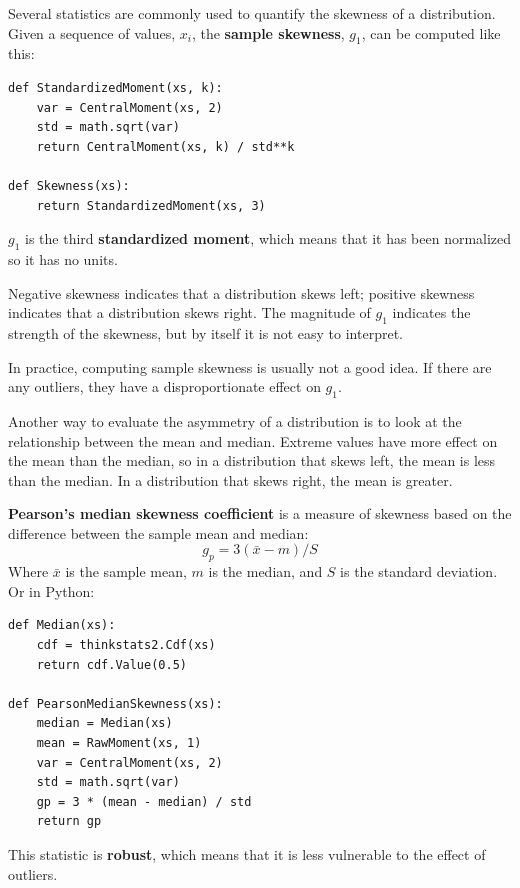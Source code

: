 \documentclass[12pt]{book}
\newcommand{\xbar}{\bar{x}}
\theoremstyle{exercise}
\begin{document}
Several statistics are commonly used to quantify the skewness of a
distribution.  Given a sequence of values, $x_i$, the {\bf sample
  skewness}, $g_1$, can be computed like this:

\begin{verbatim}
def StandardizedMoment(xs, k):
    var = CentralMoment(xs, 2)
    std = math.sqrt(var)
    return CentralMoment(xs, k) / std**k

def Skewness(xs):
    return StandardizedMoment(xs, 3)
\end{verbatim}

$g_1$ is the third {\bf standardized moment}, which means that it has
been normalized so it has no units.%

Negative skewness indicates that a distribution 
skews left; positive skewness indicates
that a distribution skews right.  The magnitude of $g_1$ indicates
the strength of the skewness, but by itself it is not easy to
interpret.

In practice, computing sample skewness is usually not
a good idea.  If there are any outliers, they
have a disproportionate effect on $g_1$.%

Another way to evaluate the asymmetry of a distribution is to look
at the relationship between the mean and median.
Extreme values have more effect on the mean than the median, so
in a distribution that skews left, the mean is less than the median.
In a distribution that skews right, the mean is greater.%
%

{\bf Pearson's median skewness coefficient} is a measure
of skewness based on the difference between the
sample mean and median:
%
\[ g_p = 3 (\xbar - m) / S \]
%
Where $\xbar$ is the sample mean, $m$ is the median, and
$S$ is the standard deviation.  Or in Python:%

\begin{verbatim}
def Median(xs):
    cdf = thinkstats2.Cdf(xs)
    return cdf.Value(0.5)

def PearsonMedianSkewness(xs):
    median = Median(xs)
    mean = RawMoment(xs, 1)
    var = CentralMoment(xs, 2)
    std = math.sqrt(var)
    gp = 3 * (mean - median) / std
    return gp
\end{verbatim}

This statistic is {\bf robust}, which means that it is less vulnerable
to the effect of outliers.%
%
\end{document}
